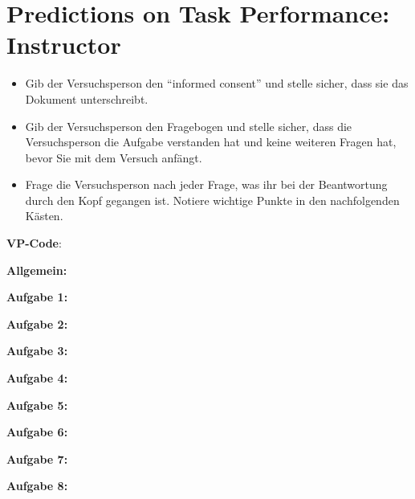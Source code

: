 \documentclass[color=9c]{tudaexercise}
\def\boxheight{1.2cm}
\begin{document}
\section*{Predictions on Task Performance: Instructor}

\begin{itemize}
	\item Gib der Versuchsperson den ``informed consent'' und stelle sicher, dass sie das Dokument unterschreibt.
	\item Gib der Versuchsperson den Fragebogen und stelle sicher, dass die Versuchsperson die Aufgabe verstanden hat und keine weiteren Fragen hat, bevor Sie mit dem Versuch anfängt.
	\item Frage die Versuchsperson nach jeder Frage, was ihr bei der Beantwortung durch den Kopf gegangen ist. Notiere wichtige Punkte in den nachfolgenden Kästen.
\end{itemize}

\vspace{2mm}

\textbf{VP-Code}: \fbox{\color{white}\rule{2cm}{2mm}\color{black}}

\vspace{3mm}

\noindent\textbf{Allgemein:}\\
\fbox{\color{white}\rule{.99\linewidth}{\boxheight}\color{black}}

\noindent\textbf{Aufgabe 1:}\\
\fbox{\color{white}\rule{.99\linewidth}{\boxheight}\color{black}}

\noindent\textbf{Aufgabe 2:}\\
\fbox{\color{white}\rule{.99\linewidth}{\boxheight}\color{black}}

\noindent\textbf{Aufgabe 3:}\\
\fbox{\color{white}\rule{.99\linewidth}{\boxheight}\color{black}}

\noindent\textbf{Aufgabe 4:}\\
\fbox{\color{white}\rule{.99\linewidth}{\boxheight}\color{black}}

\noindent\textbf{Aufgabe 5:}\\
\fbox{\color{white}\rule{.99\linewidth}{\boxheight}\color{black}}

\noindent\textbf{Aufgabe 6:}\\
\fbox{\color{white}\rule{.99\linewidth}{\boxheight}\color{black}}

\noindent\textbf{Aufgabe 7:}\\
\fbox{\color{white}\rule{.99\linewidth}{\boxheight}\color{black}}

\noindent\textbf{Aufgabe 8:}\\
\fbox{\color{white}\rule{.99\linewidth}{\boxheight}\color{black}}
\end{document}
